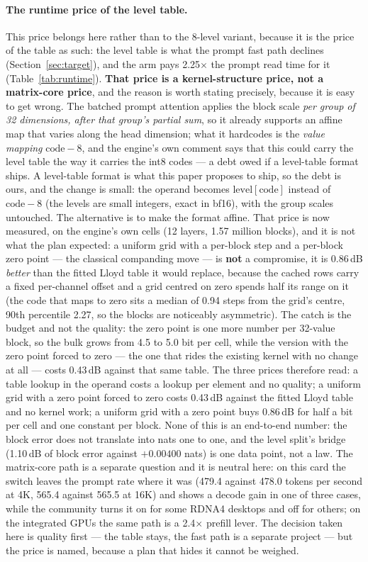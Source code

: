 \documentclass[10pt,twocolumn]{article}
\begin{document}
\paragraph{The runtime price of the level table.} This price belongs here rather than to the 8-level variant, because it is the price of the table as such: the level table is what the prompt fast path declines (Section~\ref{sec:target}), and the arm pays 2.25$\times$ the prompt read time for it (Table~\ref{tab:runtime}). \textbf{That price is a kernel-structure price, not a matrix-core price}, and the reason is worth stating precisely, because it is easy to get wrong. The batched prompt attention applies the block scale \emph{per group of 32 dimensions, after that group's partial sum}, so it already supports an affine map that varies along the head dimension; what it hardcodes is the \emph{value mapping} $\text{code}-8$, and the engine's own comment says that this could carry the level table the way it carries the int8 codes --- a debt owed if a level-table format ships. A level-table format is what this paper proposes to ship, so the debt is ours, and the change is small: the operand becomes $\mathrm{level}[\text{code}]$ instead of $\text{code}-8$ (the levels are small integers, exact in bf16), with the group scales untouched. The alternative is to make the format affine. That price is now measured, on the engine's own cells (12 layers, 1.57 million blocks), and it is not what the plan expected: a uniform grid with a per-block step and a per-block zero point --- the classical companding move --- is \textbf{not} a compromise, it is 0.86\,dB \emph{better} than the fitted Lloyd table it would replace, because the cached rows carry a fixed per-channel offset and a grid centred on zero spends half its range on it (the code that maps to zero sits a median of 0.94 steps from the grid's centre, 90th percentile 2.27, so the blocks are noticeably asymmetric). The catch is the budget and not the quality: the zero point is one more number per 32-value block, so the bulk grows from 4.5 to 5.0 bit per cell, while the version with the zero point forced to zero --- the one that rides the existing kernel with no change at all --- costs 0.43\,dB against that same table. The three prices therefore read: a table lookup in the operand costs a lookup per element and no quality; a uniform grid with a zero point forced to zero costs 0.43\,dB against the fitted Lloyd table and no kernel work; a uniform grid with a zero point buys 0.86\,dB for half a bit per cell and one constant per block. None of this is an end-to-end number: the block error does not translate into nats one to one, and the level split's bridge (1.10\,dB of block error against $+0.00400$ nats) is one data point, not a law. The matrix-core path is a separate question and it is neutral here: on this card the switch leaves the prompt rate where it was (479.4 against 478.0 tokens per second at 4K, 565.4 against 565.5 at 16K) and shows a decode gain in one of three cases, while the community turns it on for some RDNA4 desktops and off for others; on the integrated GPUs the same path is a 2.4$\times$ prefill lever. The decision taken here is quality first --- the table stays, the fast path is a separate project --- but the price is named, because a plan that hides it cannot be weighed.
\end{document}
